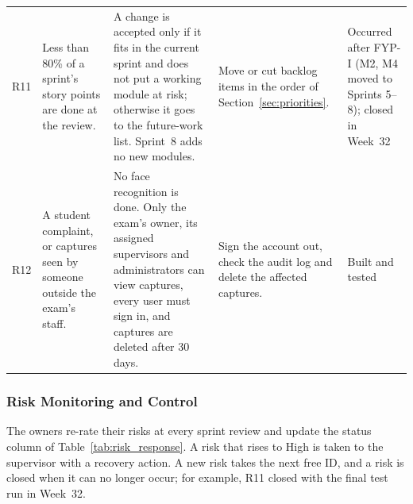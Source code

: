 {\begin{longtable}{@{}c>{\raggedright\arraybackslash}p{2.9cm}>{\raggedright\arraybackslash}p{5.2cm}>{\raggedright\arraybackslash}p{3.9cm}>{\raggedright\arraybackslash}p{1.8cm}@{}}
R11 & Less than 80\% of a sprint's story points are done at the review. & A change is accepted only if it fits in the current sprint and does not put a working module at risk; otherwise it goes to the future-work list. Sprint~8 adds no new modules. & Move or cut backlog items in the order of Section~\ref{sec:priorities}. & Occurred after FYP-I (M2, M4 moved to Sprints 5--8); closed in Week~32 \\
R12 & A student complaint, or captures seen by someone outside the exam's staff. & No face recognition is done. Only the exam's owner, its assigned supervisors and administrators can view captures, every user must sign in, and captures are deleted after 30 days. & Sign the account out, check the audit log and delete the affected captures. & Built and tested \\
\end{longtable}}

\subsubsection{Risk Monitoring and Control}

The owners re-rate their risks at every sprint review and update the status column of Table~\ref{tab:risk_response}. A risk that rises to High is taken to the supervisor with a recovery action. A new risk takes the next free ID, and a risk is closed when it can no longer occur; for example, R11 closed with the final test run in Week~32.
